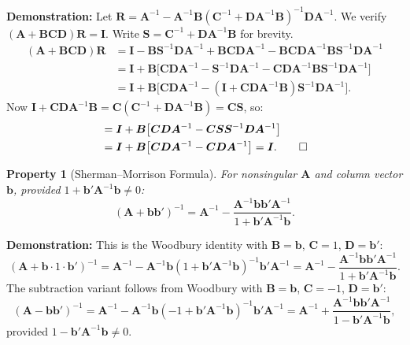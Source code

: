 \documentclass[11pt]{article}
\newtheorem{property}{Property}
\newcommand{\Ainv}{\bm{A}^{-1}}
\newcommand{\A}{\bm{A}}
\newcommand{\B}{\bm{B}}
\newcommand{\I}{\bm{I}}
\begin{document}
\textbf{Demonstration:} Let $\bm{R} = \Ainv - \Ainv\B(\bm{C}^{-1} + \bm{D}\Ainv\B)^{-1}\bm{D}\Ainv$. We verify $(\A + \B\bm{C}\bm{D})\bm{R} = \I$. Write $\bm{S} = \bm{C}^{-1} + \bm{D}\Ainv\B$ for brevity.
\begin{align*}
(\A + \B\bm{C}\bm{D})\bm{R}
&= \I - \B\bm{S}^{-1}\bm{D}\Ainv + \B\bm{C}\bm{D}\Ainv - \B\bm{C}\bm{D}\Ainv\B\bm{S}^{-1}\bm{D}\Ainv \\
&= \I + \B\bigl[\bm{C}\bm{D}\Ainv - \bm{S}^{-1}\bm{D}\Ainv - \bm{C}\bm{D}\Ainv\B\bm{S}^{-1}\bm{D}\Ainv\bigr] \\
&= \I + \B\bigl[\bm{C}\bm{D}\Ainv - (\I + \bm{C}\bm{D}\Ainv\B)\bm{S}^{-1}\bm{D}\Ainv\bigr].
\end{align*}
Now $\I + \bm{C}\bm{D}\Ainv\B = \bm{C}(\bm{C}^{-1} + \bm{D}\Ainv\B) = \bm{C}\bm{S}$, so:
\begin{align*}
&= \I + \B\bigl[\bm{C}\bm{D}\Ainv - \bm{C}\bm{S}\bm{S}^{-1}\bm{D}\Ainv\bigr] \\
&= \I + \B\bigl[\bm{C}\bm{D}\Ainv - \bm{C}\bm{D}\Ainv\bigr] = \I. \qed
\end{align*}

\begin{property}[Sherman--Morrison Formula]
For nonsingular $\A$ and column vector $\bm{b}$, provided $1 + \bm{b}'\Ainv\bm{b} \neq 0$:
\[
(\A + \bm{b}\bm{b}')^{-1} = \Ainv - \frac{\Ainv\bm{b}\bm{b}'\Ainv}{1 + \bm{b}'\Ainv\bm{b}}.
\]
\end{property}

\textbf{Demonstration:} This is the Woodbury identity with $\B = \bm{b}$, $\bm{C} = 1$, $\bm{D} = \bm{b}'$:
\[
(\A + \bm{b}\cdot 1\cdot\bm{b}')^{-1}
= \Ainv - \Ainv\bm{b}(1 + \bm{b}'\Ainv\bm{b})^{-1}\bm{b}'\Ainv
= \Ainv - \frac{\Ainv\bm{b}\bm{b}'\Ainv}{1 + \bm{b}'\Ainv\bm{b}}.
\]
The subtraction variant follows from Woodbury with $\B = \bm{b}$, $\bm{C} = -1$, $\bm{D} = \bm{b}'$:
\[
(\A - \bm{b}\bm{b}')^{-1}
= \Ainv - \Ainv\bm{b}(-1 + \bm{b}'\Ainv\bm{b})^{-1}\bm{b}'\Ainv
= \Ainv + \frac{\Ainv\bm{b}\bm{b}'\Ainv}{1 - \bm{b}'\Ainv\bm{b}},
\]
provided $1 - \bm{b}'\Ainv\bm{b} \neq 0$.
\end{document}
